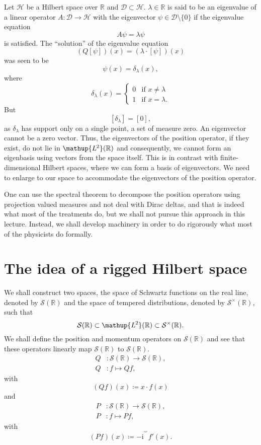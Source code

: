 \documentclass[12pt, a4 paper]{article}
\theoremstyle{definition}
\newcommand{\ltwo}{\mathup{L\kern-0.5pt^2}}
\newcommand{\position}{Q}
\newcommand{\momentum}{P}
\newcommand{\rr}{\mathbb{R}}
\newcommand{\dirac}{\delta}
\newcommand{\hilbert}{\mathcal{H}}
\newcommand{\ltwor}{\ltwo(\rr)}
\newcommand{\schwartz}{\mathcal{S}}
\newcommand{\schwartzr}{\schwartz(\rr)}
\newcommand{\dist}{\schwartz^\times}
\newcommand{\distr}{\dist(\rr)}
\renewcommand*{\hbar}{\mathrm{^^^^0127}}
\renewcommand{\i}{\mathrm{i}}
\newcommand{\domain}{\mathcal{D}}
\begin{document}
	Let $\hilbert$ be a Hilbert space over $\rr$ and $\domain \subset \hilbert$. $\lambda \in \rr$ is said to be an eigenvalue of a linear operator $A \colon \domain \rightarrow \hilbert$ with the eigenvector $\psi \in \domain\setminus\{0\}$ if the eigenvalue equation
	\[A\psi = \lambda \psi\]
	is satisfied.
	The ``solution'' of the eigenvalue equation
	\[(\position[\psi])(x) = (\lambda\cdot[\psi])(x)\]
	was seen to be
	\[\psi(x) = \dirac_\lambda(x),\]
	where
	\[\dirac_\lambda(x) =
	\begin{cases}
		0 & \text{if $x \neq \lambda$}\\
		1 & \text{if $x = \lambda$}.
	\end{cases}
	\]
	But \[[\dirac_\lambda] = [0],\] as $\dirac_\lambda$ has support only on a single point, a set of measure zero. An eigenvector cannot be a zero vector. Thus, the eigenvectors of the position operator, if they exist, do not lie in $\ltwor$ and consequently, we cannot form an eigenbasis using vectors from the space itself. This is in contrast with finite-dimensional Hilbert spaces, where we can form a basis of eigenvectors. We need to enlarge to our space to accommodate the eigenvectors of the position operator.

	One can use the spectral theorem to decompose the position operators using projection valued measures and not deal with Dirac deltas, and that is indeed what most of the treatments do, but we shall not pursue this approach in this lecture. Instead, we shall develop machinery in order to do rigorously what most of the physicists do formally.

	\section{The idea of a rigged Hilbert space}

	We shall construct two spaces, the space of Schwartz functions on the real line, denoted by $\schwartzr$ and the space of tempered distributions, denoted by $\distr$, such that
	\[
	\schwartzr \subset \ltwor \subset \distr.
	\]
	We shall define the position and momentum operators on $\schwartzr$ and see that these operators linearly map $\schwartzr$ to $\schwartzr$.
	\begin{align*}
		\position &\colon \schwartzr \rightarrow \schwartzr,\\
		\position &\colon f \mapsto \position f,
	\end{align*}
	with
	\[
	(\position f)(x) \coloneq x \cdot f(x)
	\]
	and
	\begin{align*}
		\momentum &\colon \schwartzr \rightarrow \schwartzr,\\
		\momentum &\colon f \mapsto \momentum f,
	\end{align*}
	with
	\[
	(\momentum f)(x) \coloneq -\i\hbar f'(x).
	\]
\end{document}
